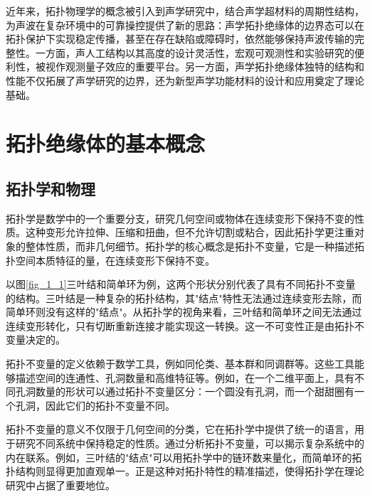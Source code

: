 近年来，拓扑物理学的概念被引入到声学研究中，结合声学超材料的周期性结构，为声波在复杂环境中的可靠操控提供了新的思路：声学拓扑绝缘体的边界态可以在拓扑保护下实现稳定传播，甚至在存在缺陷或障碍时，依然能够保持声波传输的完整性。一方面，声人工结构以其高度的设计灵活性，宏观可观测性和实验研究的便利性，被视作观测量子效应的重要平台。另一方面，声学拓扑绝缘体独特的结构和性能不仅拓展了声学研究的边界，还为新型声学功能材料的设计和应用奠定了理论基础。


\section{拓扑绝缘体的基本概念}
\subsection{拓扑学和物理}
拓扑学是数学中的一个重要分支，研究几何空间或物体在连续变形下保持不变的性质\cite{d1}。这种变形允许拉伸、压缩和扭曲，但不允许切割或粘合，因此拓扑学更注重对象的整体性质，而非几何细节。拓扑学的核心概念是拓扑不变量，它是一种描述拓扑空间本质特征的量，在连续变形下保持不变。

以图\ref{fig_1_1}三叶结和简单环为例，这两个形状分别代表了具有不同拓扑不变量的结构。三叶结是一种复杂的拓扑结构，其"结点"特性无法通过连续变形去除，而简单环则没有这样的"结点"。从拓扑学的视角来看，三叶结和简单环之间无法通过连续变形转化，只有切断重新连接才能实现这一转换。这一不可变性正是由拓扑不变量决定的。

拓扑不变量的定义依赖于数学工具，例如同伦类、基本群和同调群等。这些工具能够描述空间的连通性、孔洞数量和高维特征等。例如，在一个二维平面上，具有不同孔洞数量的形状可以通过拓扑不变量区分：一个圆没有孔洞，而一个甜甜圈有一个孔洞，因此它们的拓扑不变量不同。

拓扑不变量的意义不仅限于几何空间的分类，它在拓扑学中提供了统一的语言，用于研究不同系统中保持稳定的性质。通过分析拓扑不变量，可以揭示复杂系统中的内在联系。例如，三叶结的"结点"可以用拓扑学中的链环数来量化，而简单环的拓扑结构则显得更加直观单一。正是这种对拓扑特性的精准描述，使得拓扑学在理论研究中占据了重要地位。

